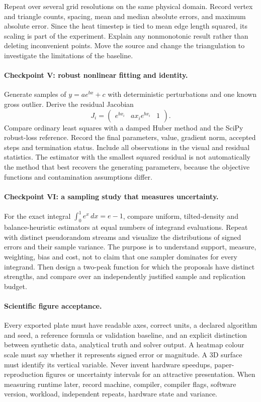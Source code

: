 Repeat over several grid resolutions on the same physical domain.
Record vertex and triangle counts, spacing, mean and median absolute
errors, and maximum absolute error. Since the heat timestep is tied
to mean edge length squared, its scaling is part of the experiment.
Explain any nonmonotonic result rather than deleting inconvenient
points. Move the source and change the triangulation to investigate
the limitations of the baseline.

\paragraph{Checkpoint V: robust nonlinear fitting and identity.}
Generate samples of \(y=a e^{bx}+c\) with deterministic perturbations
and one known gross outlier. Derive the residual Jacobian
\[
J_i=\begin{pmatrix}e^{bx_i}&a x_i e^{bx_i}&1\end{pmatrix}.
\]
Compare ordinary least squares with a damped Huber method and the
SciPy robust-loss reference. Record the final parameters, value,
gradient norm, accepted steps and termination status. Include all
observations in the visual and residual statistics. The estimator
with the smallest squared residual is not automatically the method
that best recovers the generating parameters, because the objective
functions and contamination assumptions differ.

\paragraph{Checkpoint VI: a sampling study that measures uncertainty.}
For the exact integral \(\int_0^1 e^x\,dx=e-1\), compare uniform,
tilted-density and balance-heuristic estimators at equal numbers of
integrand evaluations. Repeat with distinct pseudorandom streams
and visualize the distributions of signed errors and their sample
variance. The purpose is to understand support, measure, weighting,
bias and cost, not to claim that one sampler dominates for every
integrand. Then design a two-peak function for which the proposals
have distinct strengths, and compare over an independently justified
sample and replication budget.

\paragraph{Scientific figure acceptance.}
Every exported plate must have readable axes, correct units, a
declared algorithm and seed, a reference formula or validation
baseline, and an explicit distinction between synthetic data,
analytical truth and solver output. A heatmap colour scale must
say whether it represents signed error or magnitude. A 3D surface
must identify its vertical variable. Never invent hardware speedups,
paper-reproduction figures or uncertainty intervals for an attractive
presentation. When measuring runtime later, record machine, compiler,
compiler flags, software version, workload, independent repeats,
hardware state and variance.

